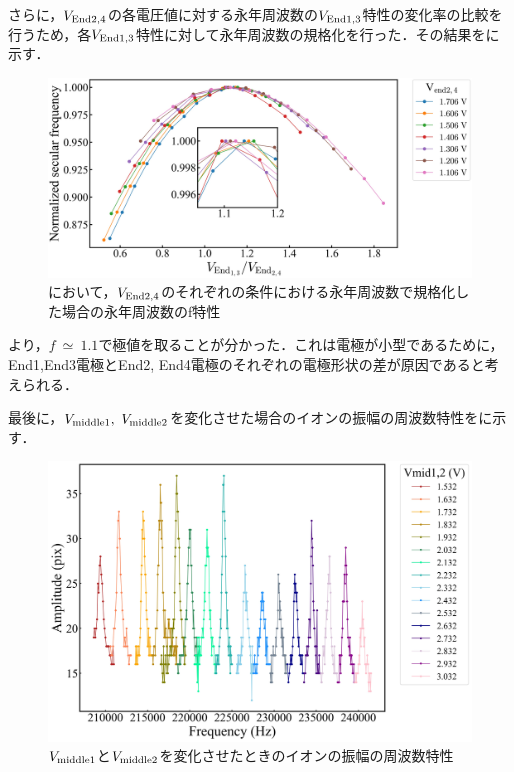 さらに，$V_{\rm End2,4}$の各電圧値に対する永年周波数の$V_{\rm End1,3}$特性の変化率の比較を行うため，各$V_{\rm End1,3}$特性に対して永年周波数の規格化を行った．その結果をに示す．

\begin{figure}[h]
	\begin{center}
		\includegraphics[width = 0.7\linewidth]{./results/figure/Normalized_Vendodd_Vendeven-SecFreqZ_.jpg}
		\caption{において，$V_{\rm End2,4}$のそれぞれの条件における永年周波数で規格化した場合の永年周波数のf特性}
		\label{fig:Norm_Vendodd_Vendeven_f}
	\end{center}
\end{figure}

より，$f \ \simeq \ 1.1$で極値を取ることが分かった．これは電極が小型であるために，End1,End3電極とEnd2, End4電極のそれぞれの電極形状の差が原因であると考えられる．

\clearpage

最後に，$V_{\rm middle1}, \ V_{\rm middle2}$を変化させた場合のイオンの振幅の周波数特性をに示す．

\begin{figure}[h]
	\begin{center}
		\includegraphics[width = 0.6\linewidth]{./results/figure/mid-SecFreq.jpg}
		\caption{$V_{\rm middle1}$と$V_{\rm middle2}$を変化させたときのイオンの振幅の周波数特性}
		\label{fig:mid_MeasSec}
	\end{center}
\end{figure}

